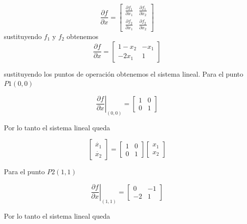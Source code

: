 \documentclass[12pt]{book}
\theoremstyle{definition}
\theoremstyle{remark}
\theoremstyle{plain}
\begin{document}
\begin{equation*}
  \frac{\partial f}{\partial x}   =
\begin{bmatrix}
\frac{\partial f_1}{\partial x_1} & \frac{\partial f_1}{\partial x_2}\\
\frac{\partial f_2}{\partial x_1} & \frac{\partial f_2}{\partial x_2}
\end{bmatrix}
\end{equation*}
 sustituyendo $f_1$ y $f_2$ obtenemos
\begin{equation}
\label{equ109}
  \frac{\partial f}{\partial x} =
\begin{bmatrix}
1-x_2 & -x_1\\
-2 x_1 & 1
\end{bmatrix}
\end{equation}

sustituyendo los puntos de operación obtenemos el sistema lineal. Para el punto $P1(0,0)$ 

\begin{equation}
\label{equ110}
 \left .  \frac{\partial f}{\partial x} \right |_{(0,0)} =
\begin{bmatrix}
1 & 0\\
0 & 1
\end{bmatrix}
\end{equation}

Por lo tanto el sistema lineal queda

\begin{equation}
\label{equ111}
 \begin{bmatrix}
\dot{x_1}\\
\dot{x_2}
\end{bmatrix}=
\begin{bmatrix}
1 & 0\\
0 & 1
\end{bmatrix}
 \begin{bmatrix}
x_1\\
x_2
\end{bmatrix}
\end{equation}

Para el punto $P2(1,1)$ 

\begin{equation}
\label{equ112}
 \left .  \frac{\partial f}{\partial x} \right |_{(1,1)} =
\begin{bmatrix}
0 & -1\\
-2 & 1
\end{bmatrix}
\end{equation}

Por lo tanto el sistema lineal queda
\end{document}
